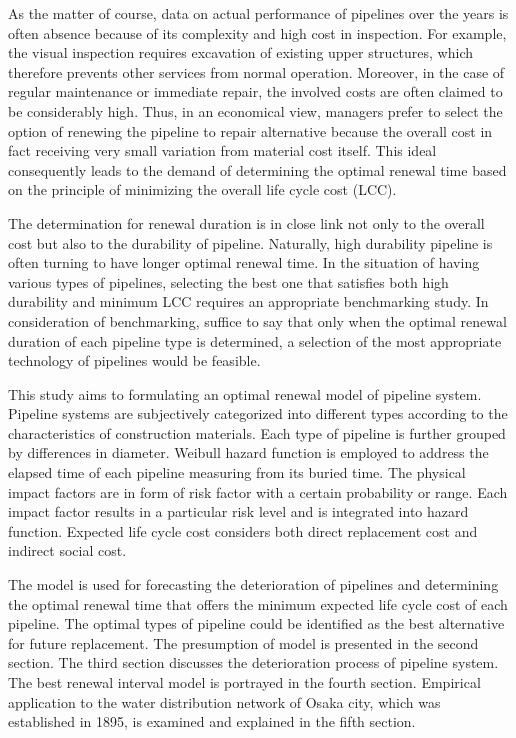 As the matter of course, data on actual performance of pipelines over the years is often absence because of its complexity and high cost in inspection. For example, the visual inspection requires excavation of existing upper structures, which therefore prevents other services from normal operation. Moreover, in the case of regular maintenance or immediate repair, the involved costs are often claimed to be considerably high. Thus, in an economical view, managers prefer to select the option of renewing the pipeline to repair alternative because the overall cost in fact receiving very small variation from material cost itself. This ideal consequently leads to the demand of determining the optimal renewal time based on the principle of minimizing the overall life cycle cost (LCC).

The determination for renewal duration is in close link not only to the overall cost but also to the durability of pipeline. Naturally, high durability pipeline is often turning to have longer optimal renewal time. In the situation of having various types of pipelines, selecting the best one that satisfies both high durability and minimum LCC requires an appropriate benchmarking study. In consideration of benchmarking, suffice to say that only when the optimal renewal duration of each pipeline type is determined, a selection of the most appropriate technology of pipelines would be feasible.

This study aims to formulating an optimal renewal model of pipeline system. Pipeline systems are subjectively categorized into different types according to the characteristics of construction materials. Each type of pipeline is further grouped by differences in diameter. Weibull hazard function is employed to address the elapsed time of each pipeline measuring from its buried time. The physical impact factors are in form of risk factor with a certain probability or range. Each impact factor results in a particular risk level and is integrated into hazard function. Expected life cycle cost considers both direct replacement cost and indirect social cost. 

The model is used for forecasting the deterioration of pipelines and determining the optimal renewal time that offers the minimum expected life cycle cost of each pipeline. The optimal types of pipeline could be identified as the best alternative for future replacement. The presumption of model is presented in the second section. The third section discusses the deterioration process of pipeline system. The best renewal interval model is portrayed in the fourth section. Empirical application to the water distribution network of Osaka city, which was established in 1895, is examined and explained in the fifth section.
